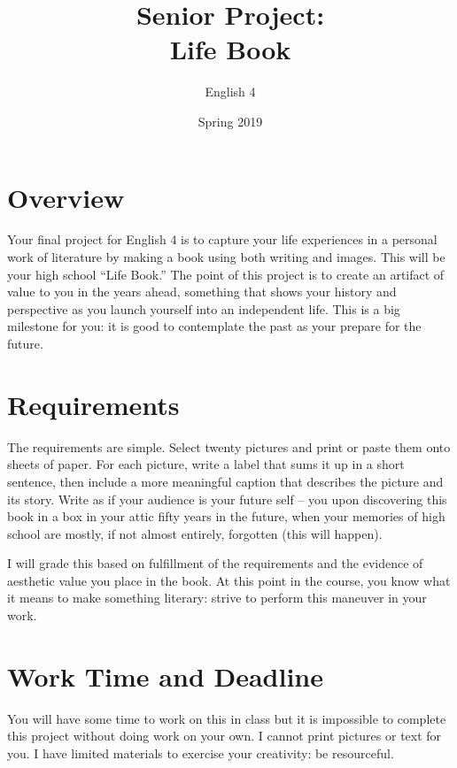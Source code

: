 \documentclass{article}
\title{Senior Project: \\ Life Book}
\author{English 4}
\date{Spring 2019}
\begin{document}
\maketitle

\setcounter{secnumdepth}{0}

\section{Overview}

  Your final project for English 4 is to capture your life
  experiences in a personal work of literature by making a book using
  both writing and images. This will be your high school ``Life
  Book.''  The point of this project is to create an artifact of value
  to you in the years ahead, something that shows your history and
  perspective as you launch yourself into an independent life. This is
  a big milestone for you: it is good to contemplate the past as your
  prepare for the future.

\section{Requirements}

  The requirements are simple. Select twenty pictures and print or
  paste them onto sheets of paper. For each picture, write a label that sums it up in a short sentence, then include a more meaningful caption
  that describes the picture and its story. Write as if your
  audience is your future self -- you upon discovering this book in a
  box in your attic fifty years in the future, when your memories of
  high school are mostly, if not almost entirely, forgotten (this will
  happen).

  I will grade this based on fulfillment of the requirements and the
  evidence of aesthetic value you place in the book. At this point in
  the course, you know what it means to make something literary:
  strive to perform this maneuver in your work.
  
\section{Work Time and Deadline}

  You will have some time to work on this in class but it is
  impossible to complete this project without doing work on your
  own. I cannot print pictures or text for you. I have limited
  materials to exercise your creativity: be resourceful.
\end{document}
